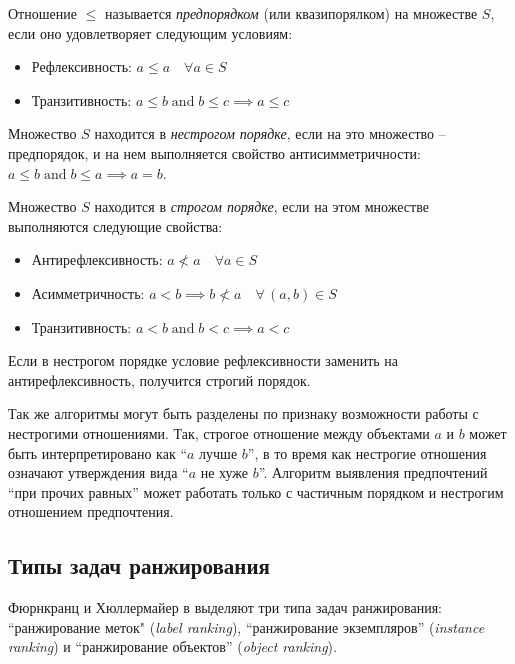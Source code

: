 	\begin{definition}
	\label{def:preorder}
		Отношение $\leq$ называется \emph{предпорядком} (или квазипорялком) на множестве $S$, если оно удовлетворяет следующим условиям\cite{harel:2000}:
		\begin{itemize} 
			\item Рефлексивность: $a \leq a \quad \forall a \in S$
			\item Транзитивность: $a \leq b\; \textrm{and}\; b \leq c  \implies a \leq c$ 
		\end{itemize}
	\end{definition}	
	\begin{definition}
	\label{def:partial_order}
		Множество $S$ находится в \emph{нестрогом порядке}, если на это множество – предпорядок, и на нем выполняется свойство антисимметричности\cite{Skiena:1991}: $a \leq b\; \textrm{and}\; b \leq a \implies a = b$.
	\end{definition}
	\begin{definition}
	\label{def:strict_order}
		Множество $S$ находится в \emph{строгом порядке}, если на этом множестве выполняются следующие свойства\cite{???}:
		\begin{itemize}
			\item Антирефлексивность: $ a \nless a \quad \forall a \in S$
			\item Асимметричность: $a < b \implies b \nless a \quad \forall \, (a, b) \in S$
			\item Транзитивность: $a < b\; \textrm{and}\; b < c \implies a < c$
		\end{itemize}
		Если в нестрогом порядке условие рефлексивности заменить на антирефлексивность, получится строгий порядок.
	\end{definition}

	
	Так же алгоритмы могут быть разделены по признаку возможности работы с нестрогими отношениями. Так, строгое отношение между объектами $a$ и $b$ может быть интерпретировано как \enquote{$a$ лучше $b$}, в то время как нестрогие отношения означают утверждения вида \enquote{$a$ не хуже $b$}.\cite[p.~384]{Barten:1982} Алгоритм выявления предпочтений \enquote{при прочих равных} может работать только с частичным порядком и нестрогим отношением предпочтения.

\subsection{Типы задач ранжирования}
	Фюрнкранц и Хюллермайер в \cite{plbook:Introduction:2010} выделяют три типа задач ранжирования: ``ранжирование меток" (\emph{label ranking}), ``ранжирование экземпляров'' (\emph{instance ranking}) и ``ранжирование объектов'' (\emph{object ranking}).
	
